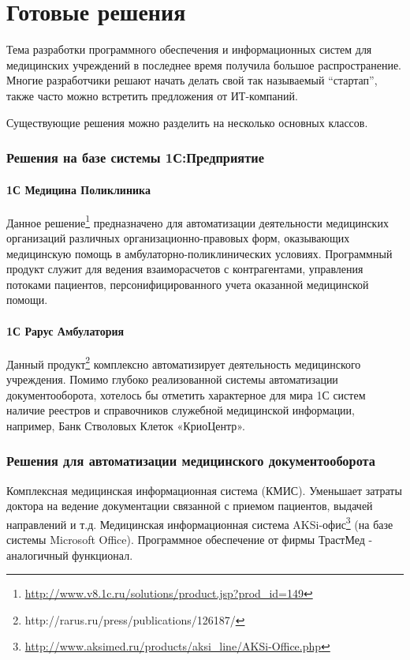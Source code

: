 \newpage
\chapter{Готовые решения}
Тема разработки программного обеспечения и информационных систем для медицинских
учреждений в последнее время получила большое распространение. Многие
разработчики решают начать делать свой так называемый “стартап”, также часто
можно встретить предложения от ИТ-компаний.

Существующие решения можно разделить на несколько основных классов.

\subsection{Решения на базе системы 1С:Предприятие}
\subsubsection{1С Медицина Поликлиника}
Данное решение\footnote{
	\url{http://www.v8.1c.ru/solutions/product.jsp?prod_id=149}
} 
предназначено для автоматизации деятельности медицинских
организаций различных организационно-правовых форм, оказывающих медицинскую
помощь в амбулаторно-поликлинических условиях. Программный продукт служит для
ведения взаиморасчетов с контрагентами, управления потоками пациентов,
персонифицированного учета оказанной медицинской помощи.

\subsubsection{1С Рарус Амбулатория}
Данный продукт\footnote{http://rarus.ru/press/publications/126187/} комплексно
автоматизирует деятельность медицинского учреждения.
Помимо глубоко реализованной системы автоматизации документооборота, хотелось бы
отметить характерное для мира 1С систем наличие реестров и справочников
служебной медицинской информации, например, Банк Стволовых Клеток «КриоЦентр».

\subsection{Решения для автоматизации медицинского документооборота}
Комплексная медицинская информационная система (КМИС). Уменьшает затраты доктора
на ведение документации связанной с приемом пациентов, выдачей направлений и
т.д.
Медицинская информационная система AKSi-офис\footnote{
	\url{http://www.aksimed.ru/products/aksi_line/AKSi-Office.php}
} 
(на базе системы Microsoft Office).
Программное обеспечение от фирмы ТрастМед - аналогичный функционал.

